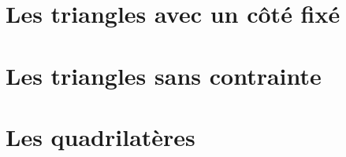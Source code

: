 \documentclass[12pt]{amsart}
\begin{document}


\section{Les triangles avec un côté fixé}






\section{Les triangles sans contrainte}






\section{Les quadrilatères}






%
%
\end{document}
